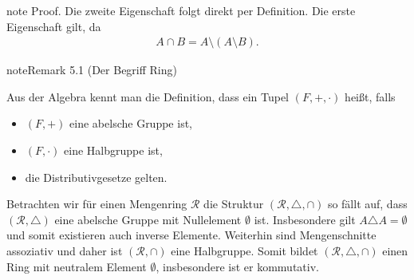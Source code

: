\documentclass[letterpaper,10pt,german]{jupyterBook}
\begin{document}
\begin{sphinxadmonition}{note}
\sphinxAtStartPar
Proof. Die zweite Eigenschaft folgt direkt per Definition. Die erste Eigenschaft gilt, da
\begin{equation*}
\begin{split}A\cap B = A\setminus (A\setminus B).\end{split}
\end{equation*}\end{sphinxadmonition}
\label{masstheorie/masstheorie:remark-2}
\begin{sphinxadmonition}{note}{Remark 5.1 (Der Begriff Ring)}



\sphinxAtStartPar
Aus der Algebra kennt man die Definition, dass ein Tupel \((F,+,\cdot)\)  heißt, falls
\begin{itemize}
\item {} 
\sphinxAtStartPar
\((F,+)\) eine abelsche Gruppe ist,

\item {} 
\sphinxAtStartPar
\((F,\cdot)\) eine Halbgruppe ist,

\item {} 
\sphinxAtStartPar
die Distributivgesetze gelten.

\end{itemize}

\sphinxAtStartPar
Betrachten wir für einen Mengenring \(\mathcal{R}\) die Struktur \((\mathcal{R}, \triangle, \cap)\) so fällt auf, dass \((\mathcal{R},\triangle)\) eine abelsche Gruppe mit Nullelement \(\emptyset\) ist. Insbesondere gilt \(A\triangle A=\emptyset\) und somit existieren auch inverse Elemente. Weiterhin sind Mengenschnitte assoziativ und daher ist \((\mathcal{R}, \cap)\) eine Halbgruppe. Somit bildet \((\mathcal{R},\triangle,\cap)\) einen Ring mit neutralem Element \(\emptyset\), insbesondere ist er kommutativ.
\end{sphinxadmonition}
\end{document}
